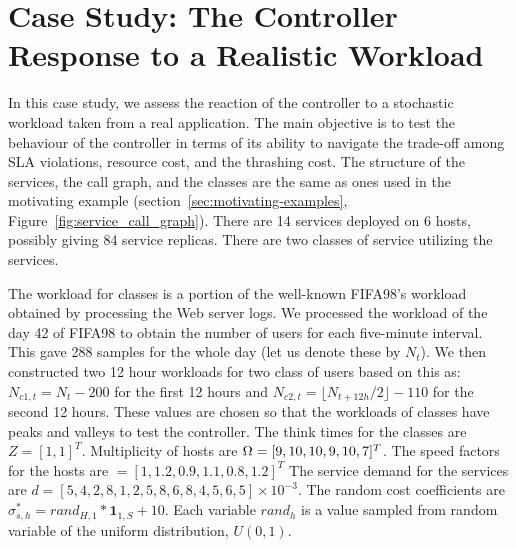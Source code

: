   
 \section{Case Study: The Controller Response to a Realistic Workload} 
 \label{sec:cases-study}  
  In this case study, we assess the reaction of the controller to a stochastic workload taken from a real application. The main objective is to test the behaviour of the controller in terms of its ability to navigate the trade-off among SLA violations, resource cost, and the thrashing cost.  The structure of the services, the call graph, and the classes are the same as ones used in the motivating example (section~\ref{sec:motivating-examples}, Figure~\ref{fig:service_call_graph}).
   There are 14 services deployed on 6 hosts, possibly giving 84 service replicas. There are two classes of service utilizing the services.

	The workload for classes is a portion of the well-known FIFA98's workload obtained by processing the Web server logs. We processed the workload of the day 42 of FIFA98 to obtain the number of users for each five-minute interval. This gave 288 samples for the whole day (let us denote these by $N_t$).  We then constructed two 12 hour workloads for two class of users based on this as:
$N_{c1,t}=N_t-200$ for the first 12 hours and $N_{c2,t}= \lfloor N_{t+12h}/2\rfloor-110$ for the second 12 hours. These values are chosen so that the workloads of classes have peaks and valleys to test the controller. 
The think times for the classes are $Z=[1, 1]^T$.
Multiplicity of hosts are $\Omega=[9, 10, 10, 9, 10, 7]^T$.
The speed factors for the hosts are $=[1, 1.2, 0.9, 1.1, 0.8, 1.2]^T$
The service demand for the services are $d=[5, 4, 2, 8, 1, 2, 5, 8, 6, 8, 4, 5, 6, 5]\times 10^{-3}$.
The random cost coefficients are $\sigma^*_{s,h}=rand_{H,1}*\textbf{1}_{1,S}+10$.
 Each variable $rand_h$ is a value sampled from random variable of the uniform distribution, $U(0,1)$. 

